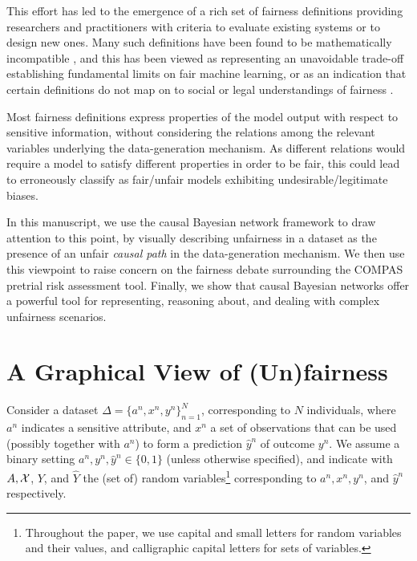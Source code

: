 \documentclass[runningheads]{llncs}
\begin{document}
This effort has led to the emergence of a rich set of fairness definitions \cite{chouldechova17fair,corbett-davies17algorithmic,dwork12fairness,feldman15certifying,mitchell18fair} providing researchers and practitioners with criteria to evaluate existing systems or to design new ones. Many such definitions have been found to be mathematically incompatible 
\cite{berk18fairness,chouldechova17fair,corbett-davies16computer,corbett-davies17algorithmic,kleinberg16inherent},
and this has been viewed as representing an
unavoidable trade-off establishing fundamental limits on fair machine learning, or as an indication that certain definitions do not map on to social or legal understandings of fairness \cite{corbett-davies18measure}. 

Most fairness definitions express properties of the model output with respect to sensitive information, without considering the relations among the relevant variables underlying the data-generation mechanism. As different relations would require a model to satisfy different properties in order to be fair, this could lead to erroneously classify as fair/unfair models exhibiting undesirable/legitimate biases.

In this manuscript, we use the causal Bayesian network framework to draw attention to this point, by visually describing unfairness in a dataset as the presence of an unfair \emph{causal path} in the data-generation mechanism. We then use this viewpoint to raise concern on the fairness debate surrounding the COMPAS pretrial risk assessment tool. Finally, we show that causal Bayesian networks offer a powerful tool for representing, reasoning about, and dealing with complex unfairness scenarios.

\section{A Graphical View of (Un)fairness\label{sec:SDF}}
Consider a dataset $\Delta =\{a^n,x^n,y^n\}_{n=1}^N$, corresponding to $N$ individuals, where $a^n$ indicates a sensitive attribute, and $x^n$ a set of observations that can be used (possibly together with $a^n$) to form a prediction $\hat y^n$ of outcome $y^n$. 
We assume a binary setting $a^n,y^n,\hat y^n\in\{0,1\}$ (unless otherwise specified), and indicate with $A,{\cal X}$, $Y$, and $\hat Y$ the (set of) random variables\footnote{Throughout the paper, we use capital and small letters for random variables and their values, and calligraphic capital letters for sets of variables.} corresponding to $a^n,x^n,y^n$, and $\hat y^n$ respectively.
\end{document}
